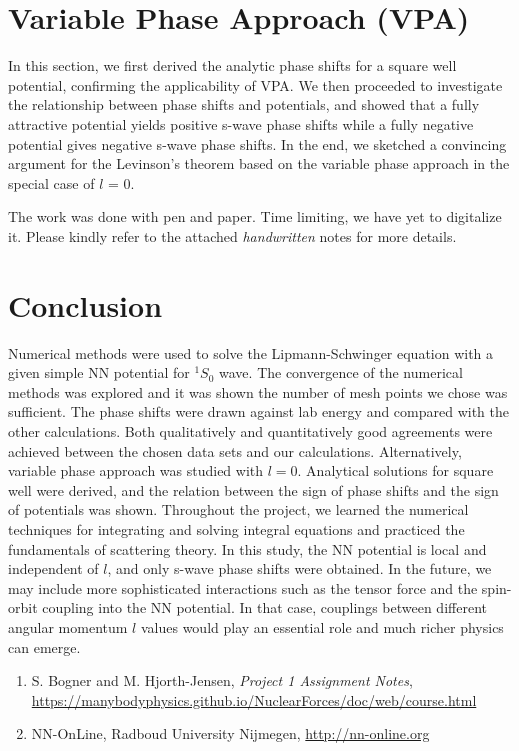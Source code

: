 \documentclass{article}
\begin{document}
\begin{multicols}{2}
\section{Variable Phase Approach (VPA)}
In this section, we first derived the analytic phase shifts for a square well potential, confirming the applicability of VPA. We then proceeded to investigate the relationship between phase shifts and potentials, and showed that a fully attractive potential yields positive s-wave phase shifts while a fully negative potential gives negative s-wave phase shifts. In the end, we sketched a convincing argument for the Levinson's theorem based on the variable phase approach in the special case of $l$ = 0. 

The work was done with pen and paper. Time limiting, we have yet to digitalize it. Please kindly refer to the attached \emph{handwritten} notes for more details.


\clearpage
\section{Conclusion}
Numerical methods were used to solve the Lipmann-Schwinger equation with a given simple NN potential for $^1S_0$ wave. The convergence of the numerical methods was explored and it was shown the number of mesh points we chose was sufficient. The phase shifts were drawn against lab energy and compared with the other calculations. Both qualitatively and quantitatively good agreements were achieved between the chosen data sets and our calculations. Alternatively, variable phase approach was studied with $l=0$. Analytical solutions for square well were derived, and the relation between the sign of phase shifts and the sign of potentials was shown. Throughout the project, we learned the numerical techniques for integrating and solving integral equations and practiced the fundamentals of scattering theory. In this study, the NN potential is local and independent of $l$, and only s-wave phase shifts were obtained. In the future, we may include more sophisticated interactions such as the tensor force and the spin-orbit coupling into the NN potential. In that case, couplings between different angular momentum $l$ values would play an essential role and much richer physics can emerge. 

\end{multicols}

\hrulefill

\begin{enumerate} %

\item S. Bogner and M. Hjorth-Jensen, \textit{Project 1 Assignment Notes}, \url{https://manybodyphysics.github.io/NuclearForces/doc/web/course.html}

\item NN-OnLine, Radboud University Nijmegen, \url{http://nn-online.org}

\end{enumerate}
\end{document}
